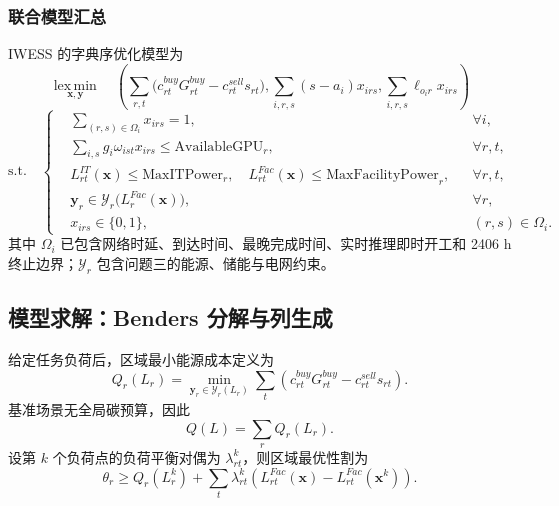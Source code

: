 \subsubsection{联合模型汇总}

IWESS 的字典序优化模型为
\begin{equation}
\operatorname*{lex\,min}_{\mathbf x,\mathbf y}\quad
\left(
\sum_{r,t}\bigl(c^{buy}_{rt}G^{buy}_{rt}-c^{sell}_{rt}s_{rt}\bigr),
\sum_{i,r,s}(s-a_i)x_{irs},
\sum_{i,r,s}\ell_{o_i r}x_{irs}
\right)
\label{eq:q4-summary-obj}
\end{equation}
\begin{equation}
\mathrm{s.t.}\quad
\left\{
\begin{aligned}
&\sum_{(r,s)\in\Omega_i}x_{irs}=1,&&\forall i,\\
&\sum_{i,s}g_i\omega_{ist}x_{irs}\le\mathrm{AvailableGPU}_r,&&\forall r,t,\\
&L^{IT}_{rt}(\mathbf x)\le\mathrm{MaxITPower}_r,\quad
L^{Fac}_{rt}(\mathbf x)\le\mathrm{MaxFacilityPower}_r,&&\forall r,t,\\
&\mathbf y_r\in\mathcal Y_r\bigl(L_r^{Fac}(\mathbf x)\bigr),&&\forall r,\\
&x_{irs}\in\{0,1\},&&(r,s)\in\Omega_i.
\end{aligned}
\right.
\label{eq:q4-summary-con}
\end{equation}
其中 $\Omega_i$ 已包含网络时延、到达时间、最晚完成时间、实时推理即时开工和 2406 h 终止边界；$\mathcal Y_r$ 包含问题三的能源、储能与电网约束。

\subsection{模型求解：Benders 分解与列生成}

给定任务负荷后，区域最小能源成本定义为
\begin{equation}
Q_r(L_r)=\min_{\mathbf y_r\in\mathcal Y_r(L_r)}\sum_t\left(c^{buy}_{rt}G^{buy}_{rt}-c^{sell}_{rt}s_{rt}\right).
\end{equation}
基准场景无全局碳预算，因此
\begin{equation}
Q(L)=\sum_rQ_r(L_r).
\end{equation}
设第 $k$ 个负荷点的负荷平衡对偶为 $\lambda_{rt}^k$，则区域最优性割为
\begin{equation}
\theta_r\ge Q_r(L_r^k)+\sum_t\lambda_{rt}^k\left(L_{rt}^{Fac}(\mathbf x)-L_{rt}^{Fac}(\mathbf x^k)\right).
\label{eq:q4-benders-cut}
\end{equation}

